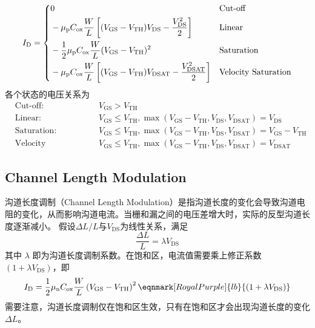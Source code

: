 \begin{equation}
    I_{\mathrm{D}} = 
    \begin{dcases}  %
        \begin{aligned}
            & 0 && \text{Cut-off} \\
            & -\mu_{\mathrm{p}} C_{\mathrm{ox}} \frac{W}{L} \left[ (V_{\mathrm{GS}} - V_{\mathrm{TH}}) V_{\mathrm{DS}} - \frac{V_{\mathrm{DS}}^2}{2} \right] && \text{Linear} \\
            & -\frac{1}{2} \mu_{\mathrm{p}} C_{\mathrm{ox}} \frac{W}{L} (V_{\mathrm{GS}} - V_{\mathrm{TH}})^2 && \text{Saturation} \\
            & -\mu_{\mathrm{p}} C_{\mathrm{ox}} \frac{W}{L} \left[ (V_{\mathrm{GS}} - V_{\mathrm{TH}}) V_{\mathrm{DSAT}} - \frac{V_{\mathrm{DSAT}}^2}{2} \right] && \text{Velocity Saturation}
        \end{aligned}
    \end{dcases}
\end{equation}
各个状态的电压关系为
\begin{equation}
    \begin{aligned}
        & \text{Cut-off:} && V_{\mathrm{GS}} > V_{\mathrm{TH}} \\
        & \text{Linear:} && V_{\mathrm{GS}} \leqslant V_{\mathrm{TH}}, \max \left(V_{\mathrm{GS}} - V_{\mathrm{TH}}, V_{\mathrm{DS}}, V_{\mathrm{DSAT}}\right) = V_{\mathrm{DS}} \\
        & \text{Saturation:} && V_{\mathrm{GS}} \leqslant V_{\mathrm{TH}}, \max \left(V_{\mathrm{GS}} - V_{\mathrm{TH}}, V_{\mathrm{DS}}, V_{\mathrm{DSAT}}\right) = V_{\mathrm{GS}} - V_{\mathrm{TH}} \\
        & \text{Velocity Saturation:} && V_{\mathrm{GS}} \leqslant V_{\mathrm{TH}}, \max \left(V_{\mathrm{GS}} - V_{\mathrm{TH}}, V_{\mathrm{DS}}, V_{\mathrm{DSAT}}\right) = V_{\mathrm{DSAT}}
    \end{aligned}
\end{equation}

\subsection{Channel Length Modulation}
沟道长度调制（Channel Length Modulation）是指沟道长度的变化会导致沟道电阻的变化，从而影响沟道电流。当栅和漏之间的电压差增大时，实际的反型沟道长度逐渐减小。
假设$\Delta L / L$与$V_{\mathrm{DS}}$为线性关系，满足
\begin{equation}
    \frac{\Delta L}{L} = \lambda V_{\mathrm{DS}}
\end{equation}
其中 $\lambda$ 即为沟道长度调制系数。在饱和区，电流值需要乘上修正系数 $\left(1 + \lambda V_{\mathrm{DS}}\right)$，即
\begin{equation}
    I_{\mathrm{D}} = \frac{1}{2} \mu_{\mathrm{n}} C_{\mathrm{ox}} \frac{W}{L} \left( V_{\mathrm{GS}} - V_{\mathrm{TH}} \right)^2 \eqnmark[RoyalPurple]{lb}{\left( 1 + \lambda V_{\mathrm{DS}} \right)}
\end{equation}
需要注意，沟道长度调制仅在饱和区生效，只有在饱和区才会出现沟道长度的变化$\Delta L$。

